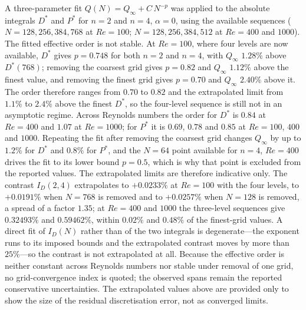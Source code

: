 A three-parameter fit $Q(N)=Q_\infty+C\,N^{-p}$ was applied to the absolute integrals $D^*$ and $P^*$ for $n=2$ and $n=4$, $\alpha=0$, using the available sequences ($N=128,256,384,768$ at $Re=100$; $N=128,256,384,512$ at $Re=400$ and $1000$). The fitted effective order is not stable. At $Re=100$, where four levels are now available, $D^*$ gives $p=0.748$ for both $n=2$ and $n=4$, with $Q_\infty$ $1.28\%$ above $D^*(768)$; removing the coarsest grid gives $p=0.82$ and $Q_\infty$ $1.12\%$ above the finest value, and removing the finest grid gives $p=0.70$ and $Q_\infty$ $2.40\%$ above it. The order therefore ranges from $0.70$ to $0.82$ and the extrapolated limit from $1.1\%$ to $2.4\%$ above the finest $D^*$, so the four-level sequence is still not in an asymptotic regime. Across Reynolds numbers the order for $D^*$ is $0.84$ at $Re=400$ and $1.07$ at $Re=1000$; for $P^*$ it is $0.69$, $0.78$ and $0.85$ at $Re=100$, $400$ and $1000$. Repeating the fit after removing the coarsest grid changes $Q_\infty$ by up to $1.2\%$ for $D^*$ and $0.8\%$ for $P^*$, and the $N=64$ point available for $n=4$, $Re=400$ drives the fit to its lower bound $p=0.5$, which is why that point is excluded from the reported values. The extrapolated limits are therefore indicative only. The contrast $I_D(2,4)$ extrapolates to $+0.0233\%$ at $Re=100$ with the four levels, to $+0.0191\%$ when $N=768$ is removed and to $+0.0257\%$ when $N=128$ is removed, a spread of a factor $1.35$; at $Re=400$ and $1000$ the three-level sequences give $0.32493\%$ and $0.59462\%$, within $0.02\%$ and $0.48\%$ of the finest-grid values. A direct fit of $I_D(N)$ rather than of the two integrals is degenerate---the exponent runs to its imposed bounds and the extrapolated contrast moves by more than $25\%$---so the contrast is not extrapolated at all. Because the effective order is neither constant across Reynolds numbers nor stable under removal of one grid, no grid-convergence index is quoted; the observed spans remain the reported conservative uncertainties. The extrapolated values above are provided only to show the size of the residual discretisation error, not as converged limits.

